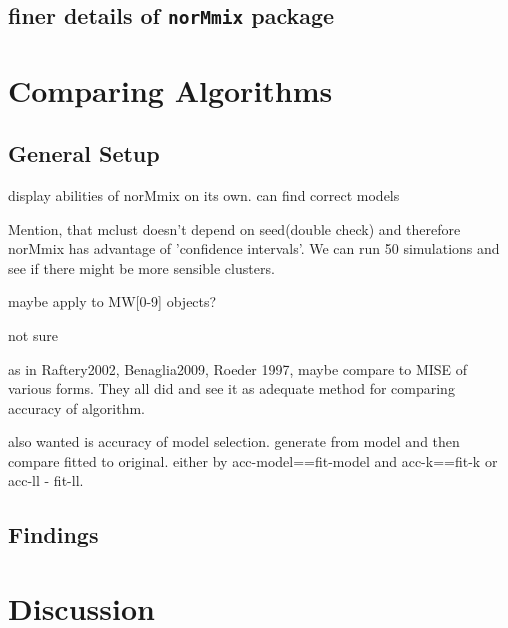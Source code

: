 \section{finer details of {\tt norMmix} package}




\chapter{Comparing Algorithms}

\section{General Setup}
display abilities of norMmix on its own. can find correct models

Mention, that mclust doesn't depend on seed(double check) and therefore norMmix has 
advantage of 'confidence intervals'. We can run 50 simulations and see if there
might be more sensible clusters.

maybe apply to MW[0-9] objects?

not sure

as in Raftery2002, Benaglia2009, Roeder 1997, maybe compare to MISE of various 
forms. They all did and see it as adequate method for comparing accuracy of 
algorithm.

also wanted is accuracy of model selection. generate from model and then compare
fitted to original. either by acc-model==fit-model and acc-k==fit-k or acc-ll - fit-ll.

\section{Findings}



\chapter{Discussion}

